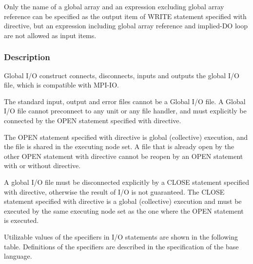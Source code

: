    Only the name of a global array and an
   expression excluding global array reference can be specified as the output item
   of WRITE statement specified with \gio directive, 
   but an expression including global array
   reference and implied-DO loop are not allowed as input items.


   \subsubsection*{Description}

   Global I/O construct connects, disconnects, inputs and outputs the global I/O file,
   which is compatible with MPI-IO.

   The standard input, output and error files cannot be a Global I/O file.
   A Global I/O file cannot preconnect to any unit or any file handler,
   and must explicitly be connected by the OPEN statement specified with
   \gio directive.

   The OPEN statement specified with \gio directive is global
   (collective) execution, and the file is shared in the executing node
   set.
   A file that is already open by the other OPEN statement with
   \gio directive cannot be reopen by an OPEN statement with or
   without \gio directive.

   A global I/O file must be disconnected explicitly by a CLOSE
   statement specified with \gio directive, otherwise the result of I/O
   is not guaranteed.
   The CLOSE statement specified with \gio directive is a global
   (collective) execution and must be executed by the same executing
   node set as the one where the OPEN statement is executed.

   Utilizable values of the specifiers in I/O statements are shown in the
   following table.
   Definitions of the specifiers are described in the specification of
   the base language.

